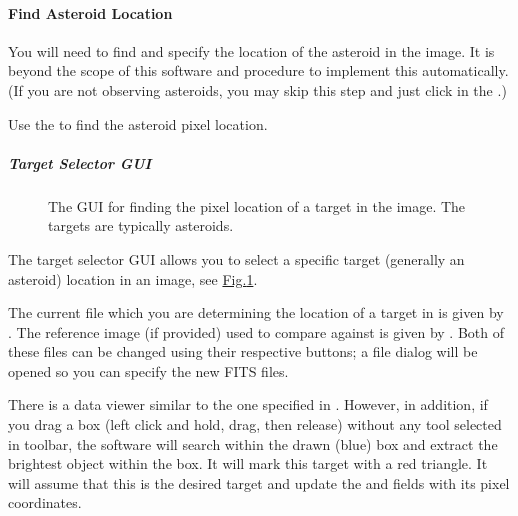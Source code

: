 \documentclass[letterpaper,11pt,english]{sphinxmanual}
\begin{document}
\paragraph{Find Asteroid Location}
\label{\detokenize{user/manual_mode:find-asteroid-location}}\label{\detokenize{user/manual_mode:user-manual-mode-procedure-find-asteroid-location}}
\sphinxAtStartPar
You will need to find and specify the location of the asteroid in the image.
It is beyond the scope of this software and procedure to implement this
automatically. (If you are not observing asteroids, you may skip this step
and just click  in the
{\hyperref[\detokenize{user/manual_mode:user-manual-mode-procedure-find-asteroid-location-target-selector-gui}]{}}.)

\sphinxAtStartPar
Use the {\hyperref[\detokenize{user/manual_mode:user-manual-mode-procedure-find-asteroid-location-target-selector-gui}]{}}
to find the asteroid pixel location.


\subparagraph{Target Selector GUI}
\label{\detokenize{user/manual_mode:target-selector-gui}}\label{\detokenize{user/manual_mode:user-manual-mode-procedure-find-asteroid-location-target-selector-gui}}
\begin{figure}[H]
\centering
\capstart

\noindent{}
\caption{The GUI for finding the pixel location of a target in the image. The
targets are typically asteroids.}\label{\detokenize{user/manual_mode:id4}}\label{\detokenize{user/manual_mode:figure-target-selector-gui}}\end{figure}

\sphinxAtStartPar
The target selector GUI allows you to select a specific target (generally an
asteroid) location in an image, see \hyperref[\detokenize{user/manual_mode:figure-target-selector-gui}]{Fig.\@ \ref{\detokenize{user/manual_mode:figure-target-selector-gui}}}.

\sphinxAtStartPar
The current file which you are determining the location of a target in is
given by . The reference image (if provided) used to
compare against is given by . Both of these files can
be changed using their respective  buttons; a file dialog
will be opened so you can specify the new FITS files.

\sphinxAtStartPar
There is a data viewer similar to the one specified in
{\hyperref[\detokenize{user/manual_mode:user-manual-mode-graphical-user-interface}]{}}. However, in addition, if you
drag a box (left click and hold, drag, then release) without any tool selected
in toolbar, the software will search within the drawn (blue) box and
extract the brightest object within the box. It will mark this target with a
red triangle. It will assume that this is the desired target and update the
 and  fields with its pixel coordinates.
\end{document}
